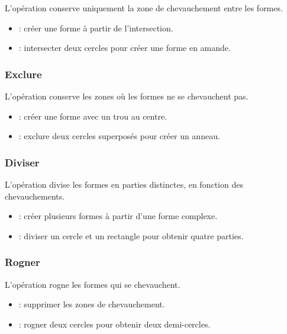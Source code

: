 L'opération  conserve uniquement la zone de chevauchement entre les formes.

\begin{itemize}
    \item {} : créer une forme à partir de l'intersection.
    \item {} : intersecter deux cercles pour créer une forme en amande.
\end{itemize}

\subsubsection{Exclure}

L'opération  conserve les zones où les formes ne se chevauchent pas.

\begin{itemize}
    \item {} : créer une forme avec un trou au centre.
    \item {} : exclure deux cercles superposés pour créer un anneau.
\end{itemize}

\subsubsection{Diviser}

L'opération  divise les formes en parties distinctes, en fonction des chevauchements.

\begin{itemize}
    \item {} : créer plusieurs formes à partir d'une forme complexe.
    \item {} : diviser un cercle et un rectangle pour obtenir quatre parties.
\end{itemize}

\subsubsection{Rogner}

L'opération  rogne les formes qui se chevauchent.

\begin{itemize}
    \item {} : supprimer les zones de chevauchement.
    \item {} : rogner deux cercles pour obtenir deux demi-cercles.
\end{itemize}

